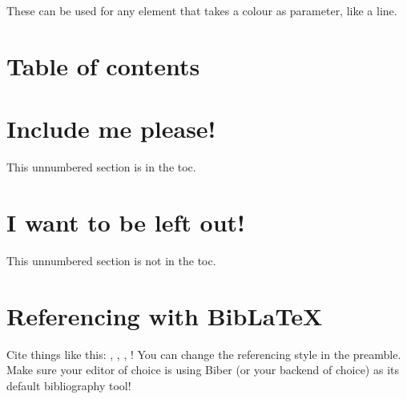 \documentclass[12pt, letterpaper]{article} %
\begin{document}
These can be used for any element that takes a colour as parameter, like a line.

\noindent {\color{TealBlue} \rule{\linewidth}{1mm}} %

\clearpage
\section{Table of contents}

\tableofcontents


\section*{Include me please!}

This unnumbered section is in the toc.

\section*{I want to be left out!}

This unnumbered section is not in the toc.

\clearpage

\section{Referencing with BibLaTeX}

Cite things like this: 
\cite{dirac}, 
\cite{einstein}, 
\cite{knuth-fa}, 
\cite{knuthwebsite}! You can change the referencing style in the preamble. 
Make sure your editor of choice is using Biber (or your backend of choice) 
as its default bibliography tool!

\printbibliography
\end{document}
